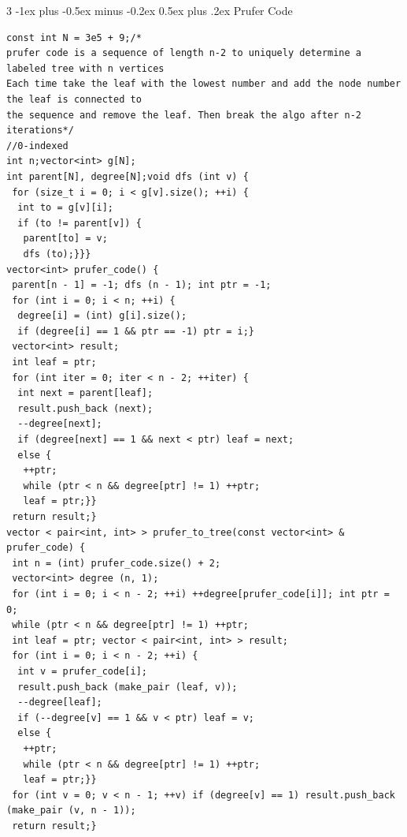 \documentclass[8pt,a4paper,onesided]{article}
\makeatletter
\renewcommand{\subsection}{\@startsection{subsection}{2}{0mm}
    {-1ex plus -0.5ex minus -0.2ex} %
    {0.5ex plus .2ex}                %
    {\normalfont\large\bfseries}}    %
\makeatother
\begin{document}
\begin{multicols}{3}
\subsection{Prufer Code}
\begin{verbatim}
const int N = 3e5 + 9;/*
prufer code is a sequence of length n-2 to uniquely determine a labeled tree with n vertices
Each time take the leaf with the lowest number and add the node number the leaf is connected to
the sequence and remove the leaf. Then break the algo after n-2 iterations*/
//0-indexed
int n;vector<int> g[N];
int parent[N], degree[N];void dfs (int v) {
 for (size_t i = 0; i < g[v].size(); ++i) {
  int to = g[v][i];
  if (to != parent[v]) {
   parent[to] = v;
   dfs (to);}}}
vector<int> prufer_code() {
 parent[n - 1] = -1; dfs (n - 1); int ptr = -1;
 for (int i = 0; i < n; ++i) {
  degree[i] = (int) g[i].size();
  if (degree[i] == 1 && ptr == -1) ptr = i;}
 vector<int> result;
 int leaf = ptr;
 for (int iter = 0; iter < n - 2; ++iter) {
  int next = parent[leaf];
  result.push_back (next);
  --degree[next];
  if (degree[next] == 1 && next < ptr) leaf = next;
  else {
   ++ptr;
   while (ptr < n && degree[ptr] != 1) ++ptr;
   leaf = ptr;}}
 return result;}
vector < pair<int, int> > prufer_to_tree(const vector<int> & prufer_code) {
 int n = (int) prufer_code.size() + 2;
 vector<int> degree (n, 1);
 for (int i = 0; i < n - 2; ++i) ++degree[prufer_code[i]]; int ptr = 0;
 while (ptr < n && degree[ptr] != 1) ++ptr;
 int leaf = ptr; vector < pair<int, int> > result;
 for (int i = 0; i < n - 2; ++i) {
  int v = prufer_code[i];
  result.push_back (make_pair (leaf, v));
  --degree[leaf];
  if (--degree[v] == 1 && v < ptr) leaf = v;
  else {
   ++ptr;
   while (ptr < n && degree[ptr] != 1) ++ptr;
   leaf = ptr;}}
 for (int v = 0; v < n - 1; ++v) if (degree[v] == 1) result.push_back (make_pair (v, n - 1));
 return result;}
\end{verbatim}

\end{multicols}
\end{document}
